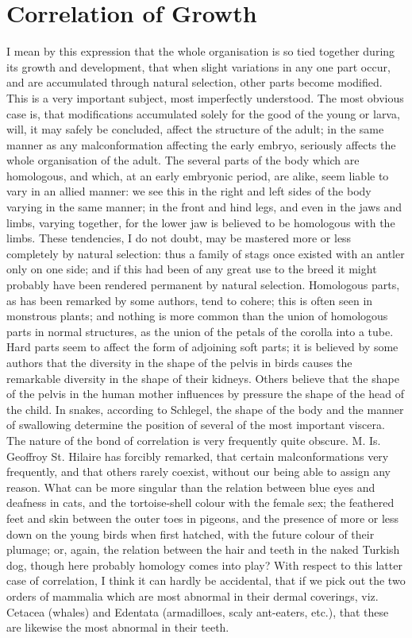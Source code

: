 \section{Correlation of Growth}
I mean by this expression that the whole organisation is so tied together during its growth and development, that when slight variations in any one part occur, and are accumulated through natural selection, other parts become modified. This is a very important subject, most imperfectly understood. The most obvious case is, that modifications accumulated solely for the good of the young or larva, will, it may safely be concluded, affect the structure of the adult; in the same manner as any malconformation affecting the early embryo, seriously affects the whole organisation of the adult. The several parts of the body which are homologous, and which, at an early embryonic period, are alike, seem liable to vary in an allied manner: we see this in the right and left sides of the body varying in the same manner; in the front and hind legs, and even in the jaws and limbs, varying together, for the lower jaw is believed to be homologous with the limbs. These tendencies, I do not doubt, may be mastered more or less completely by natural selection: thus a family of stags once existed with an antler only on one side; and if this had been of any great use to the breed it might probably have been rendered permanent by natural selection.
Homologous parts, as has been remarked by some authors, tend to cohere; this is often seen in monstrous plants; and nothing is more common than the union of homologous parts in normal structures, as the union of the petals of the corolla into a tube. Hard parts seem to affect the form of adjoining soft parts; it is believed by some authors that the diversity in the shape of the pelvis in birds causes the remarkable diversity in the shape of their kidneys. Others believe that the shape of the pelvis in the human mother influences by pressure the shape of the head of the child. In snakes, according to Schlegel, the shape of the body and the manner of swallowing determine the position of several of the most important viscera.
The nature of the bond of correlation is very frequently quite obscure. M. Is. Geoffroy St. Hilaire has forcibly remarked, that certain malconformations very frequently, and that others rarely coexist, without our being able to assign any reason. What can be more singular than the relation between blue eyes and deafness in cats, and the tortoise-shell colour with the female sex; the feathered feet and skin between the outer toes in pigeons, and the presence of more or less down on the young birds when first hatched, with the future colour of their plumage; or, again, the relation between the hair and teeth in the naked Turkish dog, though here probably homology comes into play? With respect to this latter case of correlation, I think it can hardly be accidental, that if we pick out the two orders of mammalia which are most abnormal in their dermal coverings, viz. Cetacea (whales) and Edentata (armadilloes, scaly ant-eaters, etc.), that these are likewise the most abnormal in their teeth.
